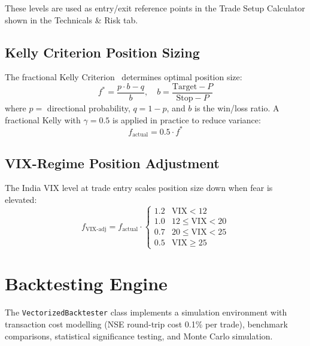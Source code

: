 \documentclass[10pt,a4paper,twoside]{article}
\begin{document}
These levels are used as entry/exit reference points in the Trade Setup
Calculator shown in the Technicals \& Risk tab.

\subsection{Kelly Criterion Position Sizing}

The fractional Kelly Criterion~\cite{kelly1956} determines optimal position size:
\begin{equation}
  f^* = \frac{p \cdot b - q}{b}, \quad b = \frac{\text{Target} - P}{\text{Stop} - P}
\end{equation}
where $p = $ directional probability, $q = 1 - p$, and $b$ is the win/loss
ratio. A fractional Kelly with $\gamma = 0.5$ is applied in practice to reduce
variance:
\begin{equation}
  f_{\text{actual}} = 0.5 \cdot f^*
\end{equation}

\subsection{VIX-Regime Position Adjustment}

The India VIX level at trade entry scales position size down when fear is
elevated:
\begin{equation}
  f_{\text{VIX-adj}} = f_{\text{actual}} \cdot \begin{cases}
    1.2 & \text{VIX} < 12 \\
    1.0 & 12 \leq \text{VIX} < 20 \\
    0.7 & 20 \leq \text{VIX} < 25 \\
    0.5 & \text{VIX} \geq 25
  \end{cases}
\end{equation}

\section{Backtesting Engine}
\label{sec:backtest}

The \texttt{VectorizedBacktester} class implements a simulation environment
with transaction cost modelling (NSE round-trip cost 0.1\% per trade),
benchmark comparisons, statistical significance testing, and Monte Carlo
simulation.
\end{document}
